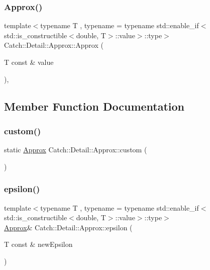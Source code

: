 \subsubsection{\texorpdfstring{Approx()}{Approx()}\hspace{0.1cm}{\footnotesize\ttfamily [2/2]}}
{\footnotesize\ttfamily template$<$typename T , typename  = typename std\+::enable\+\_\+if$<$std\+::is\+\_\+constructible$<$double, T$>$\+::value$>$\+::type$>$ \\
Catch\+::\+Detail\+::\+Approx\+::\+Approx (\begin{DoxyParamCaption}\item[{T const \&}]{value }\end{DoxyParamCaption})\hspace{0.3cm}{\ttfamily [inline]}, {\ttfamily [explicit]}}



\subsection{Member Function Documentation}
\mbox{\label{class_catch_1_1_detail_1_1_approx_aaf86dc0ee92272ac2d9839197a07951d}} 
\subsubsection{\texorpdfstring{custom()}{custom()}}
{\footnotesize\ttfamily static \mbox{\hyperlink{class_catch_1_1_detail_1_1_approx}{Approx}} Catch\+::\+Detail\+::\+Approx\+::custom (\begin{DoxyParamCaption}{ }\end{DoxyParamCaption})\hspace{0.3cm}{\ttfamily [static]}}

\mbox{\label{class_catch_1_1_detail_1_1_approx_acd26adba86a066b9f40dad467f23bc85}} 
\subsubsection{\texorpdfstring{epsilon()}{epsilon()}}
{\footnotesize\ttfamily template$<$typename T , typename  = typename std\+::enable\+\_\+if$<$std\+::is\+\_\+constructible$<$double, T$>$\+::value$>$\+::type$>$ \\
\mbox{\hyperlink{class_catch_1_1_detail_1_1_approx}{Approx}}\& Catch\+::\+Detail\+::\+Approx\+::epsilon (\begin{DoxyParamCaption}\item[{T const \&}]{new\+Epsilon }\end{DoxyParamCaption})\hspace{0.3cm}{\ttfamily [inline]}}

